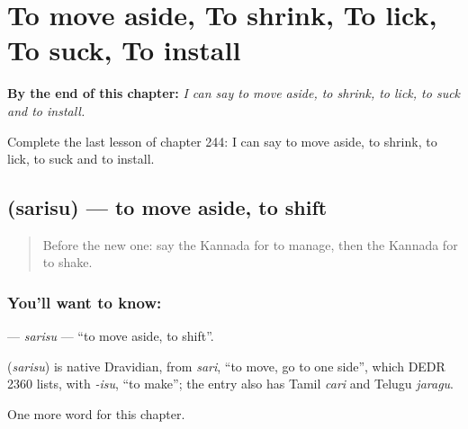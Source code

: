 
\chapter{To move aside, To shrink, To lick, To suck, To install}
\label{ch:ka-to-move-aside-to-shrink-to-lick-to-suck-to-install}

\begin{chapteropening}
\textbf{By the end of this chapter:} \emph{I can say to move aside, to shrink, to lick, to suck and to install.}

Complete the last lesson of chapter 244: I can say to move aside, to shrink, to lick, to suck and to install.
\end{chapteropening}

\section[\texorpdfstring{\kn{ಸರಿಸು} (sarisu)}{ಸರಿಸು (sarisu)}]{ (sarisu) — to move aside, to shift}

\label{lesson:KA-C244-sarisu}



\begin{quote}
Before the new one: say the Kannada for to manage, then the Kannada for to shake.
\end{quote}

\subsection*{You'll want to know: }
\textbf{} — \emph{sarisu} — \textquotedblleft{}to move aside, to shift\textquotedblright{}.

\begin{cousinweb}
\textbf{} (\emph{sarisu}) is native Dravidian, from \emph{sari}, \textquotedblleft{}to move, go to one side\textquotedblright{}, which DEDR 2360 lists, with \emph{-isu}, \textquotedblleft{}to make\textquotedblright{}; the entry also has Tamil \emph{cari} and Telugu \emph{jaragu}.
\end{cousinweb}

\begin{grammarlens}[title={What you've built}]
One more word for this chapter.
\end{grammarlens}

